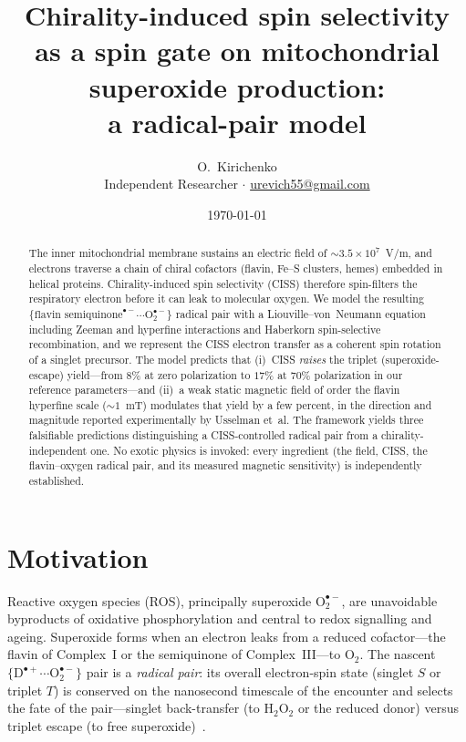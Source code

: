 \documentclass[11pt,a4paper]{article}
\title{\textbf{Chirality-induced spin selectivity as a spin gate on
mitochondrial superoxide production:\\ a radical-pair model}}
\author{O.~Kirichenko\\[2pt]\small Independent Researcher \quad$\cdot$\quad
  \href{mailto:urevich55@gmail.com}{urevich55@gmail.com}}
\date{\today}
\begin{document}
\maketitle

\begin{abstract}
\noindent
The inner mitochondrial membrane sustains an electric field of
$\sim\!3.5\times10^{7}$~V/m, and electrons traverse a chain of chiral
cofactors (flavin, Fe--S clusters, hemes) embedded in helical proteins.
Chirality-induced spin selectivity (CISS) therefore spin-filters the
respiratory electron before it can leak to molecular oxygen. We model the
resulting $\{\text{flavin semiquinone}^{\bullet-}\!\cdots\text{O}_2^{\bullet-}\}$
radical pair with a Liouville--von~Neumann equation including Zeeman and
hyperfine interactions and Haberkorn spin-selective recombination, and we
represent the CISS electron transfer as a coherent spin rotation of a
singlet precursor. The model predicts that (i)~CISS \emph{raises} the
triplet (superoxide-escape) yield---from $8\%$ at zero polarization to
$17\%$ at $70\%$ polarization in our reference parameters---and (ii)~a
weak static magnetic field of order the flavin hyperfine scale
($\sim\!1$~mT) modulates that yield by a few percent, in the direction and
magnitude reported experimentally by Usselman et~al. The framework yields
three falsifiable predictions distinguishing a CISS-controlled radical
pair from a chirality-independent one. No exotic physics is invoked: every
ingredient (the field, CISS, the flavin--oxygen radical pair, and its
measured magnetic sensitivity) is independently established.
\end{abstract}

\section{Motivation}
Reactive oxygen species (ROS), principally superoxide $\text{O}_2^{\bullet-}$,
are unavoidable byproducts of oxidative phosphorylation and central to
redox signalling and ageing. Superoxide forms when an electron leaks from
a reduced cofactor---the flavin of Complex~I or the semiquinone of
Complex~III---to $\text{O}_2$. The nascent
$\{\text{D}^{\bullet+}\!\cdots\text{O}_2^{\bullet-}\}$ pair is a
\emph{radical pair}: its overall electron-spin state (singlet $S$ or
triplet $T$) is conserved on the nanosecond timescale of the encounter
and selects the fate of the pair---singlet back-transfer (to
$\text{H}_2\text{O}_2$ or the reduced donor) versus triplet escape (to
free superoxide)~\cite{steiner,hore}.
\end{document}
